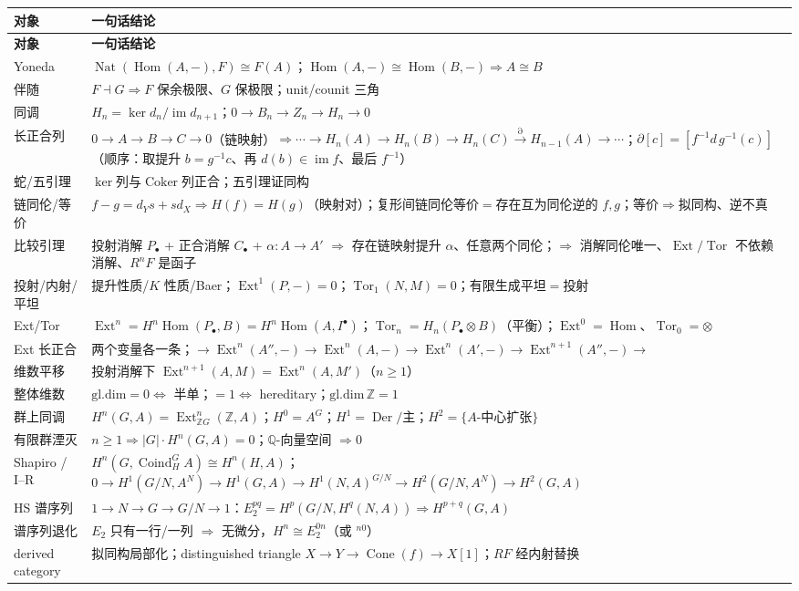 \documentclass[12pt,a4paper]{ctexart}
\DeclareMathOperator{\Hom}{Hom}
\DeclareMathOperator{\Ext}{Ext}
\DeclareMathOperator{\Tor}{Tor}
\DeclareMathOperator{\Coker}{Coker}
\DeclareMathOperator{\im}{im}
\DeclareMathOperator{\Der}{Der}
\begin{document}
\begin{longtable}{|p{6.2cm}|p{8.6cm}|}
\hline
\textbf{对象} & \textbf{一句话结论} \\\hline
\endfirsthead
\hline
\textbf{对象} & \textbf{一句话结论} \\\hline
\endhead
Yoneda & $\operatorname{Nat}(\Hom(A,-),F)\cong F(A)$；$\Hom(A,-)\cong\Hom(B,-)\Rightarrow A\cong B$ \\\hline
伴随 & $F\dashv G\Rightarrow F$ 保余极限、$G$ 保极限；unit/counit 三角 \\\hline
同调 & $H_n=\ker d_n/\im d_{n+1}$；$0\to B_n\to Z_n\to H_n\to0$ \\\hline
长正合列 & $0\to A\to B\to C\to0$（链映射）$\Rightarrow\cdots\to H_n(A)\to H_n(B)\to H_n(C)\xrightarrow{\partial}H_{n-1}(A)\to\cdots$；$\partial[c]=[f^{-1}d\,g^{-1}(c)]$（顺序：取提升 $b=g^{-1}c$、再 $d(b)\in\im f$、最后 $f^{-1}$）\\\hline
蛇/五引理 & $\ker$列与$\Coker$列正合；五引理证同构 \\\hline
链同伦/等价 & $f-g=d_Ys+sd_X\Rightarrow H(f)=H(g)$（映射对）；复形间链同伦等价$=$存在互为同伦逆的 $f,g$；等价$\Rightarrow$拟同构、逆不真 \\\hline
比较引理 & 投射消解 $P_\bullet$ + 正合消解 $C_\bullet$ + $\alpha\colon A\to A'$ $\Rightarrow$ 存在链映射提升 $\alpha$、任意两个同伦；$\Rightarrow$ 消解同伦唯一、$\Ext/\Tor$ 不依赖消解、$R^nF$ 是函子 \\\hline
投射/内射/平坦 & 提升性质/$K$ 性质/Baer；$\Ext^1(P,-)=0$；$\Tor_1(N,M)=0$；有限生成平坦$=$投射 \\\hline
Ext/Tor & $\Ext^n=H^n\Hom(P_\bullet,B)=H^n\Hom(A,I^\bullet)$；$\Tor_n=H_n(P_\bullet\otimes B)$（平衡）；$\Ext^0=\Hom$、$\Tor_0=\otimes$ \\\hline
Ext 长正合 & 两个变量各一条；$\to\Ext^n(A'',-)\to\Ext^n(A,-)\to\Ext^n(A',-)\to\Ext^{n+1}(A'',-)\to$ \\\hline
维数平移 & 投射消解下 $\Ext^{n+1}(A,M)=\Ext^n(A,M')$（$n\ge1$） \\\hline
整体维数 & $\mathrm{gl.dim}=0\iff$ 半单；$=1\iff$ hereditary；$\mathrm{gl.dim}\,\mathbb Z=1$ \\\hline
群上同调 & $H^n(G,A)=\Ext^n_{\mathbb ZG}(\mathbb Z,A)$；$H^0=A^G$；$H^1=\Der/\text{主}$；$H^2=\{A$-中心扩张$\}$ \\\hline
有限群湮灭 & $n\ge1\Rightarrow |G|\cdot H^n(G,A)=0$；$\mathbb Q$-向量空间 $\Rightarrow0$ \\\hline
Shapiro / I--R & $H^n(G,\operatorname{Coind}_H^G A)\cong H^n(H,A)$；$0\to H^1(G/N,A^N)\to H^1(G,A)\to H^1(N,A)^{G/N}\to H^2(G/N,A^N)\to H^2(G,A)$ \\\hline
HS 谱序列 & $1\to N\to G\to G/N\to1$：$E_2^{pq}=H^p(G/N,H^q(N,A))\Rightarrow H^{p+q}(G,A)$ \\\hline
谱序列退化 & $E_2$ 只有一行/一列 $\Rightarrow$ 无微分，$H^n\cong E_2^{0n}$（或 ${}^{n0}$）\\\hline
derived category & 拟同构局部化；distinguished triangle $X\to Y\to\operatorname{Cone}(f)\to X[1]$；$RF$ 经内射替换 \\\hline
\end{longtable}
\end{document}
